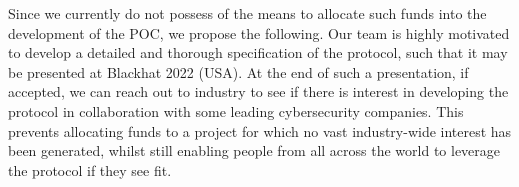 Since we currently do not possess of the means to allocate such funds into the development of the POC, we propose the following. Our team is highly motivated to develop a detailed and thorough specification of the protocol, such that it may be presented at Blackhat 2022 (USA). At the end of such a presentation, if accepted, we can reach out to industry to see if there is interest in developing the protocol in collaboration with some leading cybersecurity companies. This prevents allocating funds to a project for which no vast industry-wide interest has been generated, whilst still enabling people from all across the world to leverage the protocol if they see fit.